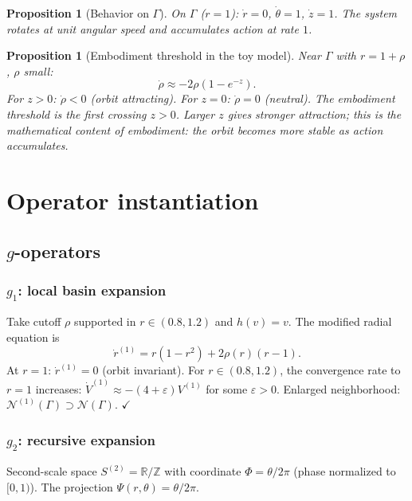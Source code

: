 \documentclass[12pt, oneside]{book}
\theoremstyle{plain}
\newtheorem{proposition}[theorem]{Proposition}
\theoremstyle{definition}
\theoremstyle{remark}
\newcommand{\R}{\mathbb{R}}
\newcommand{\Orb}{\Gamma}
\newcommand{\cN}{\mathcal{N}}
\newcommand{\eps}{\varepsilon}
\begin{document}
\begin{proposition}[Behavior on $\Orb$]\label{prop:onorbit}
On $\Orb$ ($r=1$): $\dot r=0$, $\dot\theta=1$, $\dot z=1$.
The system rotates at unit angular speed and accumulates action
at rate $1$.
\end{proposition}

\begin{proposition}[Embodiment threshold in the toy model]\label{prop:threshold}
Near $\Orb$ with $r=1+\rho$, $\rho$ small:
\[
  \dot\rho \approx -2\rho(1-e^{-z}).
\]
For $z>0$: $\dot\rho<0$ (orbit attracting). For $z=0$: $\dot\rho=0$
(neutral). The embodiment threshold is the first crossing $z>0$.
Larger $z$ gives stronger attraction; this is the mathematical
content of embodiment: the orbit becomes more stable as action
accumulates.
\end{proposition}

\section{Operator instantiation}\label{sec:operators}

\subsection{\texorpdfstring{$g$}{g}-operators}

\subsubsection{$g_1$: local basin expansion}

Take cutoff $\rho$ supported in $r\in(0.8,1.2)$ and $h(v)=v$.
The modified radial equation is
\[
  \dot r^{(1)} = r(1-r^2) + 2\rho(r)(r-1).
\]
At $r=1$: $\dot r^{(1)}=0$ (orbit invariant). For $r\in(0.8,1.2)$,
the convergence rate to $r=1$ increases:
$\dot V^{(1)}\approx-(4+\eps)V^{(1)}$ for some $\eps>0$.
Enlarged neighborhood: $\cN^{(1)}(\Orb)\supset\cN(\Orb)$. $\checkmark$

\subsubsection{$g_2$: recursive expansion}

Second-scale space $S^{(2)}=\R/\mathbb{Z}$ with coordinate
$\Phi=\theta/2\pi$ (phase normalized to $[0,1)$).
The projection $\Psi(r,\theta)=\theta/2\pi$.
\end{document}
